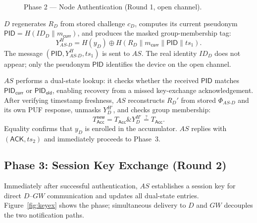 \documentclass[conference]{IEEEtran}
\begin{document}
\begin{figure}[!t]
  \caption{Phase 2 — Node Authentication (Round 1, open channel).}
  \label{fig:auth}
\end{figure}

$D$ regenerates $R_D$ from stored challenge $c_D$, computes its current
pseudonym $\mathsf{PID} = H(ID_D \| m_\mathsf{curr})$, and produces the
masked group-membership tag:
\begin{equation}
  Y_{AS\text{-}D}^H = H(y_D) \oplus H(R_D \| m_\mathsf{curr} \| \mathsf{PID} \| ts_1).
\end{equation}
The message $(\mathsf{PID}, Y_{AS\text{-}D}^H, ts_1)$ is sent to $AS$.
The real identity $ID_D$ does not appear; only the pseudonym $\mathsf{PID}$
identifies the device on the open channel.

$AS$ performs a dual-state lookup: it checks whether the received
$\mathsf{PID}$ matches $\mathsf{PID}_\mathsf{curr}$ or
$\mathsf{PID}_\mathsf{old}$, enabling recovery from a missed key-exchange
acknowledgement.  After verifying timestamp freshness, $AS$ reconstructs
$R_D'$ from stored $\Phi_{AS\text{-}D}$ and its own PUF response, unmasks
$Y_D^{H'}$, and checks group membership:
\begin{equation}
  T_\mathsf{Acc}^\mathsf{new} = T_\mathsf{Acc} \mathbin{\&} Y_D^{H'} \stackrel{?}{=} T_\mathsf{Acc}.
\end{equation}
Equality confirms that $y_D$ is enrolled in the accumulator.  $AS$ replies
with $(\mathsf{ACK}, ts_2)$ and immediately proceeds to Phase~3.

\subsection{Phase 3: Session Key Exchange (Round 2)}

Immediately after successful authentication, $AS$ establishes a session key
for direct $D$--$GW$ communication and updates all dual-state entries.
Figure~\ref{fig:keyex} shows the phase; simultaneous delivery to $D$ and
$GW$ decouples the two notification paths.
\end{document}
